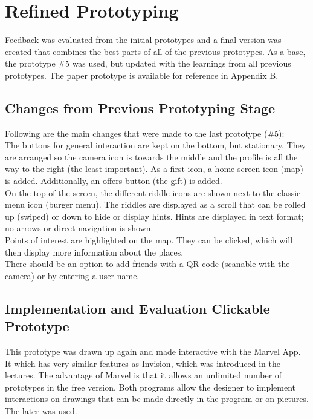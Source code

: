 \documentclass[10pt,twocolumn]{article} %
\begin{document}
\section*{Refined Prototyping}

Feedback was evaluated from the initial prototypes and a final version was created that combines the best parts of all of the previous prototypes.
As a base, the prototype \#5 was used, but updated with the learnings from all previous prototypes. The paper prototype is available for reference in Appendix B.

\subsection*{Changes from Previous Prototyping Stage}
Following are the main changes that were made to the last prototype (\#5): \\

The buttons for general interaction are kept on the bottom, but stationary. They are arranged so the camera icon is towards the middle and the profile is all the way to the right (the least important). As a first icon, a home screen icon (map) is added. Additionally, an offers button (the gift) is added. \\

On the top of the screen, the different riddle icons are shown next to the classic menu icon (burger menu). The riddles are displayed as a scroll that can be rolled up (swiped) or down to hide or display hints. Hints are displayed in text format; no arrows or direct navigation is shown.\\
Points of interest are highlighted on the map. They can be clicked, which will then display more information about the places.\\
There should be an option to add friends with a QR code (scanable with the camera) or by entering a user name. 

\subsection*{Implementation and Evaluation Clickable Prototype}
This prototype was drawn up again and made interactive with the Marvel App. It which has very similar features as Invision, which was introduced in the lectures. The advantage of Marvel is that it allows an unlimited number of prototypes in the free version. Both programs allow the designer to implement interactions on drawings that can be made directly in the program or on pictures. The later was used.
\end{document}
